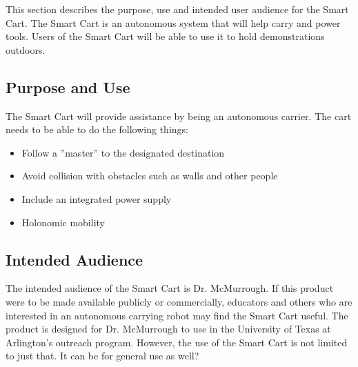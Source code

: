This section describes the purpose, use and intended user audience for the Smart Cart. The Smart Cart is an autonomous system that will help carry and power tools. Users of the Smart Cart will be able to use it to hold demonstrations outdoors.

\subsection{Purpose and Use}
The Smart Cart will provide assistance by being an autonomous carrier. The cart needs to be able to do the following things:
\begin{itemize}
	\item Follow a ''master'' to the designated destination
	\item Avoid collision with obstacles such as walls and other people
	\item Include an integrated power supply
	\item Holonomic mobility
\end{itemize}


\subsection{Intended Audience}
The intended audience of the Smart Cart is Dr. McMurrough. If this product were to be made available publicly or commercially, educators and others who are interested in an autonomous carrying robot may find the Smart Cart useful. The product is designed for Dr. McMurrough to use in the University of Texas at Arlington's outreach program. However, the use of the Smart Cart is not limited to just that. It can be for general use as well?
